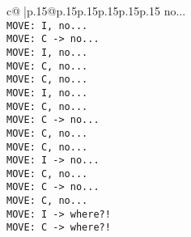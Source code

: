 \documentclass{article}
\begin{document}
{\begin{supertabular}{c@{$\;$}|p{.15\linewidth}@{}p{.15\linewidth}p{.15\linewidth}p{.15\linewidth}p{.15\linewidth}p{.15\linewidth}}
{{{no...\\ \tt  MOVE: I, no...\\ \tt  MOVE: C -> no...\\ \tt  MOVE: I, no...\\ \tt  MOVE: C, no...\\ \tt  MOVE: C, no...\\ \tt  MOVE: I, no...\\ \tt  MOVE: C, no...\\ \tt  MOVE: C -> no...\\ \tt  MOVE: C, no...\\ \tt  MOVE: C, no...\\ \tt  MOVE: I -> no...\\ \tt  MOVE: C, no...\\ \tt  MOVE: C -> no...\\ \tt  MOVE: C, no...\\ \tt  MOVE: I -> where?!\\ \tt  MOVE: C -> where?!\\ \tt  }}}
\end{supertabular}}
\end{document}
